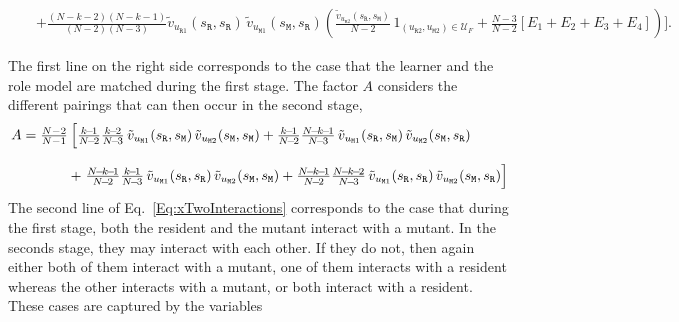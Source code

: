 \documentclass[11pt]{article}
\def\resident{\texttt{R}}
\def\mutant{\texttt{M}}
\def\strategy{s}
\theoremstyle{plainCl1}
\theoremstyle{plainCl2}
\begin{document}
\begin{equation}
\begin{array}{lll}
  &&+ \frac{\left(N - k - 2\right) \left(N - k - 1\right)}{(N\!-\!2)(N\!-\!3)} 
  \tilde{v}_{u_{\resident1}}\!(\strategy_\resident,\strategy_\resident) \, \tilde{v}_{u_{\mutant 1}}\!(\strategy_\mutant,\strategy_\resident)  
  \left(\frac{ \tilde{v}_{u_{\resident 2}}\!(\strategy_\resident,\strategy_\mutant)}{N-2} \,1_{(u_{\resident 2},u_{\mutant 2})\in \mathcal{U}_F} + \frac{N-3}{N - 2} [E_1 \!+\! E_2 \!+\! E_3 \!+\! E_4]\right) \biggl]. 
  \end{array}
\end{equation}


\noindent
The first line on the right side corresponds to the case that the learner and
the role model are matched during the first stage. 
The factor $A$ considers the different pairings that can then occur in the second stage, 
\begin{equation*}
  \setlength{\arraycolsep}{1pt}
  \begin{array}{ll}
  A  = \frac{N-2}{N-1} & \left[ \frac{k\!-\!1}{N\!-\!2}\frac{k\!-\!2}{N\!-\!3} \, \tilde{v}_{u_{\mutant 1}}(\strategy_\resident,\strategy_\mutant)\, \tilde{v}_{u_{\mutant 2}}(\strategy_\mutant,\strategy_\mutant) + 
   \frac{k\!-\!1}{N\!-\!2}\frac{N\!-\!k\!-\!1}{N\!-\!3} \, \tilde{v}_{u_{\mutant 1}}(\strategy_\resident,\strategy_\mutant) \, \tilde{v}_{u_{\mutant 2}}(\strategy_\mutant,\strategy_\resident)  \right. \\[0.5cm]
   &+ \left. \frac{N\!-\!k\!-\!1}{N\!-\!2}\frac{k\!-\!1}{N\!-\!3} \, \tilde{v}_{u_{\mutant 1}}(\strategy_\resident,\strategy_\resident) \, \tilde{v}_{u_{\mutant 2}}(\strategy_\mutant,\strategy_\mutant) + 
   \frac{N\!-\!k\!-\!1}{N\!-\!2}\frac{N\!-\!k\!-\!2}{N\!-\!3} \, \tilde{v}_{u_{\mutant 1}}(\strategy_\resident,\strategy_\resident) \, \tilde{v}_{u_{\mutant 2}}(\strategy_\mutant,\strategy_\resident)\right]
   \end{array} 
\end{equation*}   
 The second line of Eq.~\eqref{Eq:xTwoInteractions} corresponds to the case that during the first stage, both the resident and the mutant interact with a mutant. 
 In the seconds stage, they may interact with each other. 
 If they do not, then again either both of them interact with a mutant, one of them interacts with a resident whereas the other interacts with a mutant, or both interact with a resident. These cases are captured by the variables 
\end{document}
